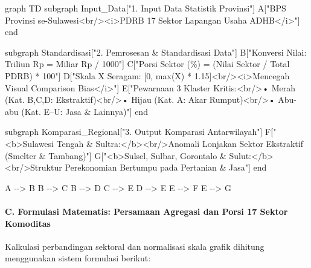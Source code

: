 \documentclass[
]{article}
\newenvironment{Shaded}{}{}
\newcommand{\NormalTok}[1]{#1}
\begin{document}
\begin{Shaded}
\begin{Highlighting}[]
\NormalTok{graph TD}
\NormalTok{    subgraph Input\_Data["1. Input Data Statistik Provinsi"]}
\NormalTok{        A["BPS Provinsi se{-}Sulawesi\textless{}br/\textgreater{}\textless{}i\textgreater{}PDRB 17 Sektor Lapangan Usaha ADHB\textless{}/i\textgreater{}"]}
\NormalTok{    end}

\NormalTok{    subgraph Standardisasi["2. Pemrosesan \& Standardisasi Data"]}
\NormalTok{        B["Konversi Nilai: Triliun Rp = Miliar Rp / 1000"]}
\NormalTok{        C["Porsi Sektor (\%) = (Nilai Sektor / Total PDRB) * 100"]}
\NormalTok{        D["Skala X Seragam: [0, max(X) * 1.15]\textless{}br/\textgreater{}\textless{}i\textgreater{}Mencegah Visual Comparison Bias\textless{}/i\textgreater{}"]}
\NormalTok{        E["Pewarnaan 3 Klaster Kritis:\textless{}br/\textgreater{}• Merah (Kat. B,C,D: Ekstraktif)\textless{}br/\textgreater{}• Hijau (Kat. A: Akar Rumput)\textless{}br/\textgreater{}• Abu{-}abu (Kat. E–U: Jasa \& Lainnya)"]}
\NormalTok{    end}

\NormalTok{    subgraph Komparasi\_Regional["3. Output Komparasi Antarwilayah"]}
\NormalTok{        F["\textless{}b\textgreater{}Sulawesi Tengah \& Sultra:\textless{}/b\textgreater{}\textless{}br/\textgreater{}Anomali Lonjakan Sektor Ekstraktif (Smelter \& Tambang)"]}
\NormalTok{        G["\textless{}b\textgreater{}Sulsel, Sulbar, Gorontalo \& Sulut:\textless{}/b\textgreater{}\textless{}br/\textgreater{}Struktur Perekonomian Bertumpu pada Pertanian \& Jasa"]}
\NormalTok{    end}

\NormalTok{    A {-}{-}\textgreater{} B}
\NormalTok{    B {-}{-}\textgreater{} C}
\NormalTok{    B {-}{-}\textgreater{} D}
\NormalTok{    C {-}{-}\textgreater{} E}
\NormalTok{    D {-}{-}\textgreater{} E}
\NormalTok{    E {-}{-}\textgreater{} F}
\NormalTok{    E {-}{-}\textgreater{} G}
\end{Highlighting}
\end{Shaded}

\paragraph{C. Formulasi Matematis: Persamaan Agregasi dan Porsi 17
Sektor
Komoditas}\label{c.-formulasi-matematis-persamaan-agregasi-dan-porsi-17-sektor-komoditas}

Kalkulasi perbandingan sektoral dan normalisasi skala grafik dihitung
menggunakan sistem formulasi berikut:
\end{document}
